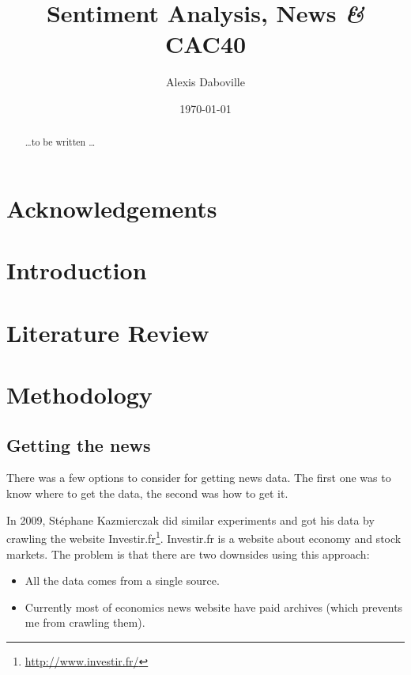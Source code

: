 \documentclass[12pt]{report}
\newcommand{\amp}{{\fontfamily{ppl}\selectfont\emph\&}}
\begin{document}
	\onehalfspace
	
	\title{Sentiment Analysis, News \amp{} CAC40}
	\date{\today}
	\author{Alexis Daboville}
	
	\maketitle
	
	\begin{abstract}
		\ldots to be written \ldots
	\end{abstract}
	
	\pagestyle{headings}
	\tableofcontents
	\listoffigures
	\listoftables
	
	\newpage
	
	\chapter*{Acknowledgements}
	
	\chapter{Introduction}
	
	\chapter{Literature Review}
	
	\chapter{Methodology}
		\section{Getting the news}
		
			There was a few options to consider for getting news data. The first one was to know where to get the data, the second was how to get it.
			
			In 2009, Stéphane Kazmierczak did similar experiments and got his data by crawling the website Investir.fr\footnote{\url{http://www.investir.fr/}}. Investir.fr is a website about economy and stock markets. The problem is that there are two downsides using this approach:
			\begin{itemize}
				\item All the data comes from a single source.
				\item Currently most of economics news website have paid archives (which prevents me from crawling them).
			\end{itemize}
			
\end{document}
